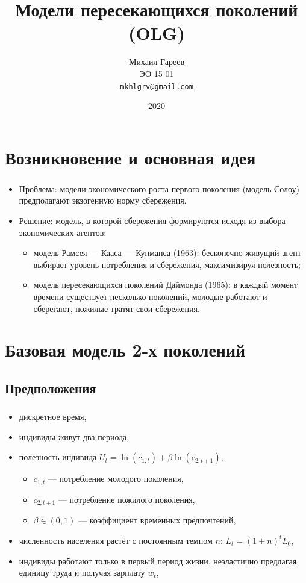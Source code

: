 \documentclass[c, dvipsnames]{beamer}  %
\title[OLG]{Модели пересекающихся поколений (OLG)}
\author[Михаил Гареев]{Михаил Гареев \\ \smallskip \scriptsize ЭО-15-01 \\ \smallskip \scriptsize \href{mailto:mkhlgrv@gmail.com}{\nolinkurl{mkhlgrv@gmail.com} }}
\institute[РАНХиГС]{ \uppercase{
 Российская Академия Народного Хозяйства и  \\ Государственной Службы при Президенте Российской Федерации}}
\date{2020}
\begin{document}
\frame[plain]{\titlepage}	%


\section{Возникновение и основная идея}

\begin{frame}
 \frametitle{\insertsection}
    \begin{itemize}
        \item Проблема: модели экономического роста первого поколения (модель Солоу) предполагают экзогенную норму сбережения.
        \item Решение: модель, в которой сбережения формируются исходя из выбора экономических агентов:
        \begin{itemize}
        \item модель Рамсея --- Кааса --- Купманса (1963): бесконечно живущий агент выбирает уровень потребления и сбережения, максимизируя полезность;
        \item модель пересекающихся поколений Даймонда (1965): в каждый момент времени существует несколько поколений, молодые работают и сберегают, пожилые тратят свои сбережения. 
        \end{itemize}
    \end{itemize}
\end{frame}

\section{Базовая модель 2-х поколений}
\subsection{Предположения}
\begin{frame}
 \frametitle{\insertsection}
 \framesubtitle{\insertsubsection}
     \begin{itemize}
        \item дискретное время,
        \item индивиды живут два периода,
        \item полезность индивида $U_t = \ln(c_{1,t}) + \beta \ln(c_{2, t+1 })$,
        \begin{itemize}
            \item $c_{1,t}$ --- потребление молодого поколения,
        \item $c_{2,t + 1}$ --- потребление пожилого поколения,
        \item $\beta \in (0, 1)$ --- коэффициент временных предпочтений,
        \end{itemize}
        \item численность населения растёт с постоянным темпом $n$: $L_t = (1+n)^t L_0$,
        \item индивиды работают только в первый период жизни, неэластично предлагая единицу труда и получая зарплату $w_t$,
        
    \end{itemize}

\end{frame}
\end{document}
